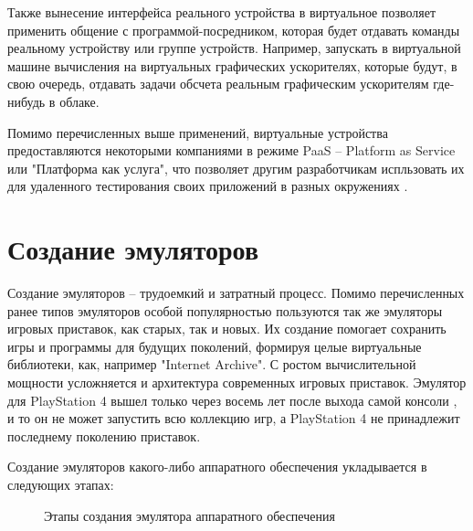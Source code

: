 Также вынесение интерфейса реального устройства в виртуальное позволяет применить общение с программой-посредником,
которая будет отдавать команды реальному устройству или группе устройств.
Например, запускать в виртуальной машине вычисления на виртуальных графических ускорителях, которые
будут, в свою очередь, отдавать задачи обсчета реальным графическим ускорителям где-нибудь в облаке.

Помимо перечисленных выше применений, виртуальные устройства предоставляются некоторыми компаниями
в режиме PaaS -- Platform as Service или "Платформа как услуга", что позволяет другим разработчикам
испльзовать их для удаленного тестирования своих приложений в разных окружениях \cite{lambdatest} \cite{genymotion}.


\section{Создание эмуляторов}\label{sec:ch1/sec3}

Создание эмуляторов -- трудоемкий и затратный процесс. Помимо перечисленных ранее типов эмуляторов особой популярностью
пользуются так же эмуляторы игровых приставок, как старых, так и новых.
Их создание помогает сохранить игры и программы для будущих поколений, формируя целые виртуальные библиотеки, как,
например "Internet Archive"\cite{console-archive}.
С ростом вычислительной мощности усложняется и архитектура современных игровых приставок.
Эмулятор для PlayStation 4 вышел только через восемь лет после выхода самой консоли \cite{ps4-emulator}, и то
он не может запустить всю коллекцию игр, а PlayStation 4 не принадлежит последнему поколению приставок.

Создание эмуляторов какого-либо аппаратного обеспечения укладывается в следующих этапах:

\begin{figure}[!htbp]
    \centering
    \caption{Этапы создания эмулятора аппаратного обеспечения}\label{fig:emu-creation-naive}
\end{figure}

